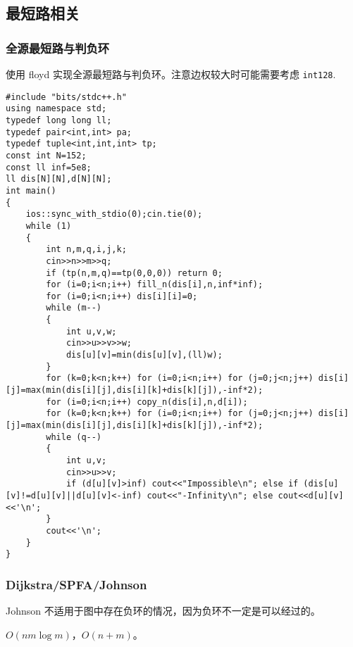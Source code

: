 \documentclass[12pt]{ctexart}
\begin{document}
\subsection{最短路相关}

\subsubsection{全源最短路与判负环}

使用 floyd 实现全源最短路与判负环。注意边权较大时可能需要考虑 \verb|int128|.

\begin{lstlisting}
#include "bits/stdc++.h"
using namespace std;
typedef long long ll;
typedef pair<int,int> pa;
typedef tuple<int,int,int> tp;
const int N=152;
const ll inf=5e8;
ll dis[N][N],d[N][N];
int main()
{
	ios::sync_with_stdio(0);cin.tie(0);
	while (1)
	{
		int n,m,q,i,j,k;
		cin>>n>>m>>q;
		if (tp(n,m,q)==tp(0,0,0)) return 0;
		for (i=0;i<n;i++) fill_n(dis[i],n,inf*inf);
		for (i=0;i<n;i++) dis[i][i]=0;
		while (m--)
		{
			int u,v,w;
			cin>>u>>v>>w;
			dis[u][v]=min(dis[u][v],(ll)w);
		}
		for (k=0;k<n;k++) for (i=0;i<n;i++) for (j=0;j<n;j++) dis[i][j]=max(min(dis[i][j],dis[i][k]+dis[k][j]),-inf*2);
		for (i=0;i<n;i++) copy_n(dis[i],n,d[i]);
		for (k=0;k<n;k++) for (i=0;i<n;i++) for (j=0;j<n;j++) dis[i][j]=max(min(dis[i][j],dis[i][k]+dis[k][j]),-inf*2);
		while (q--)
		{
			int u,v;
			cin>>u>>v;
			if (d[u][v]>inf) cout<<"Impossible\n"; else if (dis[u][v]!=d[u][v]||d[u][v]<-inf) cout<<"-Infinity\n"; else cout<<d[u][v]<<'\n';
		}
		cout<<'\n';
	}
}
\end{lstlisting}

\subsubsection{Dijkstra/SPFA/Johnson}

Johnson 不适用于图中存在负环的情况，因为负环不一定是可以经过的。

$O(nm\log m)$，$O(n+m)$。
\end{document}
